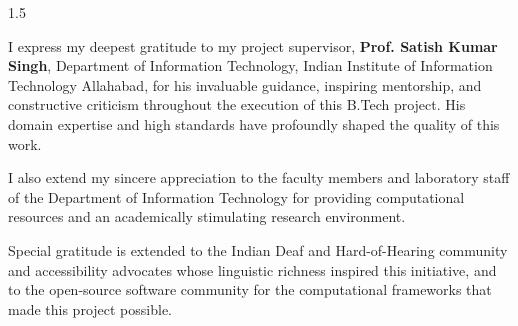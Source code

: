 
\begin{acknowledgements}
\begin{spacing}{1.5}
\addchaptertocentry{\acknowledgementname}

I express my deepest gratitude to my project supervisor, \textbf{Prof. Satish Kumar Singh}, Department of Information Technology, Indian Institute of Information Technology Allahabad, for his invaluable guidance, inspiring mentorship, and constructive criticism throughout the execution of this B.Tech project. His domain expertise and high standards have profoundly shaped the quality of this work.

I also extend my sincere appreciation to the faculty members and laboratory staff of the Department of Information Technology for providing computational resources and an academically stimulating research environment.

Special gratitude is extended to the Indian Deaf and Hard-of-Hearing community and accessibility advocates whose linguistic richness inspired this initiative, and to the open-source software community for the computational frameworks that made this project possible.

\end{spacing}
\end{acknowledgements}


\tableofcontents

\listoffigures

\listoftables


